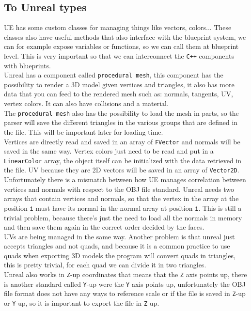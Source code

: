 \subsection{To Unreal types}
\noindent
\ac{UE} has some custom classes for managing things like vectors, colors... These classes also have useful methods that also interface with the blueprint system, we can for example expose variables or functions, so we can call them at blueprint level.
This is very important so that we can interconnect the \texttt{C++} components with blueprints.\\
Unreal has a component called \texttt{procedural mesh}, this component has the possibility to render a 3D model given vertices and triangles, it also has more data that you can feed to the rendered mesh such as: normals, tangents, UV, vertex colors.
It can also have collisions and a material.\\
The \texttt{procedural mesh} also has the possibility to load the mesh in parts, so the parser will save the different triangles in the various groups that are defined in the file.
This will be important later for loading time.\\
Vertices are directly read and saved in an array of \texttt{FVector} and normals will be saved in the same way.
Vertex colors just need to be read and put in a \texttt{LinearColor} array, the object itself can be initialized with the data retrieved in the file.
UV because they are 2D vectors will be saved in an array of \texttt{Vector2D}.
Unfortunately there is a mismatch between how \ac{UE} manages correlation between vertices and normals with respect to the OBJ file standard.
Unreal needs two arrays that contain vertices and normals, so that the vertex in the array at the position \texttt{i} must have its normal in the normal array at position \texttt{i}. 
This is still a trivial problem, because there's just the need to load all the normals in memory and then save them again in the correct order decided by the faces.\\
UVs are being managed in the same way.
Another problem is that unreal just accepts triangles and not quads, and because it is a common practice to use quads when exporting 3D models the program will convert quads in triangles, this is pretty trivial, for each quad we can divide it in two triangles.\\
Unreal also works in \texttt{Z}-up coordinates that means that the \texttt{Z} axis points up, there is another standard called \texttt{Y}-up were the \texttt{Y} axis points up, unfortunately the OBJ file format does not have any ways to reference scale or if the file is saved in \texttt{Z}-up or \texttt{Y}-up,
so it is important to export the file in \texttt{Z}-up.\\

